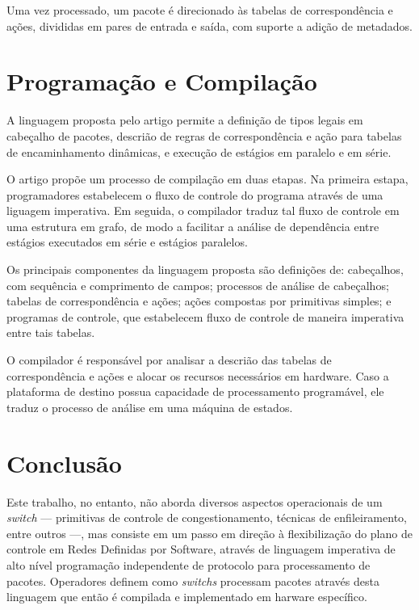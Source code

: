 Uma vez processado, um pacote é direcionado às tabelas de correspondência e ações, divididas em pares de entrada e saída, com suporte a adição de metadados.


\section*{Programação e Compilação}

A linguagem proposta pelo artigo permite a definição de tipos legais em cabeçalho de pacotes, descrião de regras de correspondência e ação para tabelas de encaminhamento dinâmicas, e execução de estágios em paralelo e em série.

O artigo propõe um processo de compilação em duas etapas. Na primeira estapa, programadores estabelecem o fluxo de controle do programa através de uma liguagem imperativa. Em seguida, o compilador traduz tal fluxo de controle em uma estrutura em grafo, de modo a facilitar a análise de dependência entre estágios executados em série e estágios paralelos.

Os principais componentes da linguagem proposta são definições de: cabeçalhos, com sequência e comprimento de campos; processos de análise de cabeçalhos; tabelas de correspondência e ações; ações compostas por primitivas simples; e programas de controle, que estabelecem fluxo de controle de maneira imperativa entre tais tabelas.

O compilador é responsável por analisar a descrião das tabelas de correspondência e ações e alocar os recursos necessários em hardware. Caso a plataforma de destino possua capacidade de processamento programável, ele traduz o processo de análise em uma máquina de estados.


\section*{Conclusão}

Este trabalho, no entanto, não aborda diversos aspectos operacionais de um \textit{switch} --- primitivas de controle de congestionamento, técnicas de enfileiramento, entre outros ---, mas consiste em um passo em direção à flexibilização do plano de controle em Redes Definidas por Software, através de linguagem imperativa de alto nível programação independente de protocolo para processamento de pacotes. Operadores definem como \textit{switchs} processam pacotes através desta linguagem que então é compilada e implementado em harware específico.
